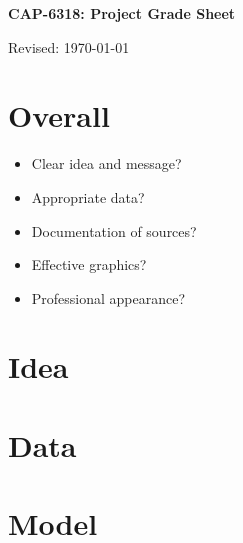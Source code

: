 \documentclass[11pt]{article}
\begin{document}



\pagebreak
\thispagestyle{empty}


\bigskip\bigskip
\centerline{\Large \bf CAP-6318:  Project Grade Sheet}
\centerline{Revised: \today}


\section*{Overall}

\begin{itemize} %
  \item Clear idea and message?
  \item Appropriate data?
  \item Documentation of sources?
  \item Effective graphics?
  \item Professional appearance?
\end{itemize}
\bigskip

\section*{Idea}

\vspace*{0.5in}



\section*{Data}

\vspace*{0.5in}


\section*{Model}

\vspace*{0.5in}
\end{document}
